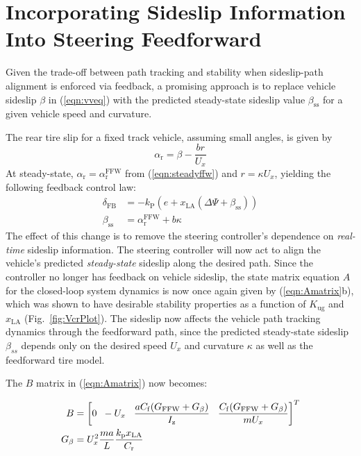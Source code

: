 \section{Incorporating Sideslip Information Into \newline Steering Feedforward}
\label{sec:goodFFW}
 
 Given the trade-off between path tracking and stability when sideslip-path alignment is enforced via feedback, a promising approach
 is to replace vehicle sideslip  $\beta$ in (\ref{eqn:vveq}) with the predicted steady-state sideslip value $\beta_\mathrm{ss}$ 
 for a given vehicle speed and curvature. 

The rear tire slip for a fixed track vehicle, assuming small angles, is given by 
\begin{equation}
\alpha_\mathrm{r} = \beta - \frac{br}{U_x}
\end{equation} 
At steady-state, $\alpha_\mathrm{r}=\alpha_\mathrm{r}^\mathrm{FFW}$ from (\ref{eqn:steadyffw}) and $r=\kappa U_x$, yielding the following feedback control law:
\begin{subequations}
\begin{align}
\label{eqn:betass}
\delta_\mathrm{FB} &=-k_\mathrm{P} \left(e+x_\mathrm{LA} (\Delta\Psi+\beta_\mathrm{ss}) \right) \\
\beta_\mathrm{ss}  &= \alpha_\mathrm{r}^\mathrm{FFW} + b\kappa
\end{align}
\end{subequations}
The effect of this change is to remove the steering controller's dependence on \textit{real-time} sideslip information. The steering
controller will now act to align the vehicle's predicted \textit{steady-state} sideslip along the desired path. Since the controller no
longer has feedback on vehicle sideslip, the state matrix equation $A$ for the closed-loop system dynamics is now 
once again given by (\ref{eqn:Amatrix}b), which was shown to have desirable stability
properties as a function of $K_\mathrm{ug}$ and $x_\mathrm{LA}$ (Fig.~\ref{fig:VcrPlot}). The sideslip now affects the vehicle
path tracking dynamics through the feedforward path, since the predicted steady-state sideslip $\beta_{ss}$ depends only on the
desired speed $U_x$ and curvature $\kappa$ as well as the feedforward tire model. 

The $B$ matrix in (\ref{eqn:Amatrix}) now becomes: 

\begin{subequations}
\label{eqn:newB}
\begin{align}
	B &=\left[0 \hspace{2 mm} -U_x \hspace{3 mm} \frac{a C_\mathrm{f} (G_\mathrm{FFW}+G_\beta)}{I_\mathrm{z}} \hspace{3 mm}  \frac{C_\mathrm{f} (G_\mathrm{FFW}+G_\beta)}{mU_x}\right]^T \\
	G_\beta &= U_x^2\frac{ma}{L}\frac{k_\mathrm{p}x_\mathrm{LA}}{C_\mathrm{r}}
\end{align}
\end{subequations}

